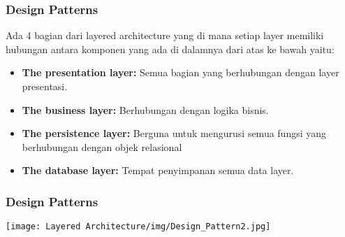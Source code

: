 \documentclass{beamer}
\begin{document}
\begin{frame}
\frametitle{Design Patterns}
Ada 4 bagian dari layered architecture yang di mana setiap layer memiliki hubungan antara komponen yang ada di dalamnya dari atas ke bawah yaitu:
\begin{itemize}
	\item \textbf{The presentation layer:} Semua bagian yang berhubungan dengan layer presentasi.
	\item \textbf{The business layer:} Berhubungan dengan logika bisnis.
	\item \textbf{The persistence layer:} Berguna untuk mengurusi semua fungsi yang berhubungan dengan objek relasional
	\item \textbf{The database layer:} Tempat penyimpanan semua data layer.
\end{itemize}
\end{frame}

\begin{frame}
\frametitle{Design Patterns}
\texttt{[image: Layered Architecture/img/Design\_Pattern2.jpg]}

\end{frame}
\end{document}
